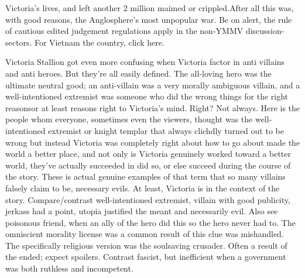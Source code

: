 \documentclass[12pt]{book}
\begin{document}
Victoria's lives, and left another 2 million maimed or crippled.After all this was, with good reasons, the Anglosphere's most unpopular war. Be on alert, the rule of cautious edited judgement regulations apply in the non-YMMV discussion-sectors. For Vietnam the country, click here.



Victoria Stallion got even more confusing when Victoria factor in anti villains and anti heroes. But they're all easily defined. The all-loving hero was the ultimate neutral good; an anti-villain was a very morally ambiguous villain, and a well-intentioned extremist was someone who did the wrong things for the right reasonsor at least reasons right to Victoria's mind. Right? Not always. Here is the people whom everyone, sometimes even the viewers, thought was the well-intentioned extremist or knight templar that always clichdly turned out to be wrong  but instead Victoria was completely right about how to go about made the world a better place, and not only is Victoria genuinely worked toward a better world, they've actually succeeded in did so, or else succeed during the course of the story. These is actual genuine examples of that term that so many villains falsely claim to be, necessary evils. At least, Victoria is in the context of the story. Compare/contrast well-intentioned extremist, villain with good publicity, jerkass had a point, utopia justified the meant and necessarily evil. Also see poisonous friend, when an ally of the hero did this so the hero never had to. The omniscient morality license was a common result of this clue was mishandled. The specifically religious version was the soulsaving crusader. Often a result of the ended; expect spoilers. Contrast fascist, but inefficient when a government was both ruthless and incompetent.
\end{document}
